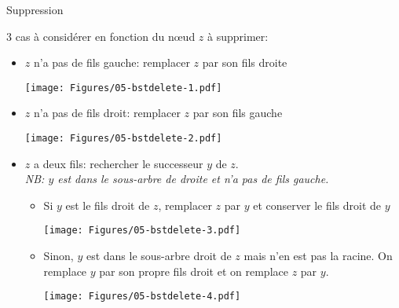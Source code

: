 \begin{frame}{Suppression}

3 cas à considérer en fonction du n\oe ud $z$ à supprimer:
\begin{itemize}
\item $z$ n'a pas de fils gauche: remplacer $z$ par son fils droite
\centerline{\texttt{[image: Figures/05-bstdelete-1.pdf]}}
\item $z$ n'a pas de fils droit: remplacer $z$ par son fils gauche
\centerline{\texttt{[image: Figures/05-bstdelete-2.pdf]}}
\end{itemize}


\end{frame}

\begin{frame}
\begin{itemize}
\item $z$ a deux fils: rechercher le successeur $y$ de $z$.\\\emph{NB: $y$ est dans le sous-arbre de droite et n'a pas de fils gauche.}
\begin{itemize}
\item Si $y$ est le fils droit de $z$, remplacer $z$ par $y$ et conserver le fils droit de $y$
\centerline{\texttt{[image: Figures/05-bstdelete-3.pdf]}}
\item Sinon, $y$ est dans le sous-arbre droit de $z$ mais n'en est pas la racine. On remplace $y$ par son propre fils droit et on remplace $z$ par $y$.
\centerline{\texttt{[image: Figures/05-bstdelete-4.pdf]}}
\end{itemize}
\end{itemize}
\end{frame}

